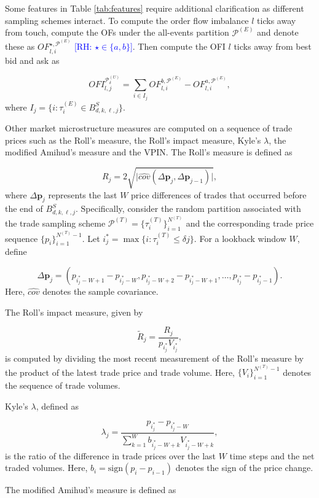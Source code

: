 \documentclass[10pt,a4paper,oneside]{article}
\newcommand{\rh}[1]{\textcolor{blue}{\textsf{[RH: #1]}}}
\begin{document}
Some features in Table \ref{tab:features} require additional clarification as different sampling schemes interact. To compute the order flow imbalance $l$ ticks away from touch, compute the OFs under the all-events partition $\mathcal{P}^{(E)}$ and denote these as $OF^{\star, \mathcal{P}^{(E)}}_{l,i}$ \rh{$\star \in \{a, b\}$}. Then compute the OFI $l$ ticks away from best bid and ask as

$$
    OFI^{\mathcal{P}^{(U)}_{\delta}}_{l, j} = \sum_{i \in I_j} OF^{b, \mathcal{P}^{(E)}}_{l,i} - OF^{a, \mathcal{P}^{(E)}}_{l,i},
$$
where $I_j = \{ i : \tau^{(E)}_i \in B^S_{d,k,\ell,j} \}$.

Other market microstructure measures are computed on a sequence of trade prices such as the Roll's measure, the Roll's impact measure, Kyle's $\lambda$, the modified Amihud's measure and the VPIN. The Roll’s measure is defined as

\[
    R_j = 2 \sqrt{\Big| \hat{cov}(\Delta \mathbf{p}_j, \Delta \mathbf{p}_{j - 1}) \Big|},
\]
where \(\Delta \mathbf{p}_j\) represents the last \(W\) price differences of trades that occurred before the end of $B^S_{d,k,\ell,j}$. Specifically, consider the random partition associated with the trade sampling scheme \(\mathcal{P}^{(T)} = \{ \tau^{(T)}_i \}_{i=1}^{N^{(T)}}\) and the corresponding trade price sequence \(\{p_i\}_{i=1}^{N^{(T)}-1}\). Let \(i^*_j = \max\{i : \tau^{(T)}_i \leq \delta j\}\). For a lookback window \(W\), define

\[
    \Delta \mathbf{p}_j = (p_{i^*_j - W + 1} - p_{i^*_j - W}, p_{i^*_j - W + 2} - p_{i^*_j - W + 1}, \dots, p_{i^*_j} - p_{i^*_j - 1}).
\]
Here, \(\hat{cov}\) denotes the sample covariance.

The Roll’s impact measure, given by

\[
    \tilde{R}_j = \frac{R_j}{p_{i^*_j} V_{i^*_j}},
\]
is computed by dividing the most recent measurement of the Roll’s measure by the product of the latest trade price and trade volume. Here, \(\{ V_i \}_{i=1}^{N^{(T)}-1}\) denotes the sequence of trade volumes.

Kyle’s \(\lambda\), defined as

\[
    \lambda_j = \frac{p_{i^*_j} - p_{i^*_j - W}}{\sum_{k=1}^W b_{i^*_j - W + k} V_{i^*_j - W + k}},
\]
is the ratio of the difference in trade prices over the last \(W\) time steps and the net traded volumes. Here, \(b_i = \text{sign}(p_i - p_{i-1})\) denotes the sign of the price change.

The modified Amihud’s measure is defined as
\end{document}
